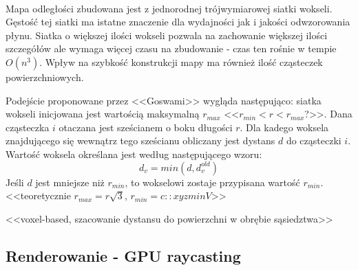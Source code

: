 \paragraph{}
Mapa odległości zbudowana jest z jednorodnej trójwymiarowej siatki wokseli. Gęstość tej siatki ma istatne znaczenie dla wydajności jak i jakości odwzorowania płynu. Siatka o większej ilości wokseli pozwala na zachowanie większej ilości szczegółów ale wymaga więcej czasu na zbudowanie - czas ten rośnie w tempie $O(n^3)$. Wpływ na szybkość konstrukcji mapy ma również ilość cząsteczek powierzchniowych.
\par
Podejście proponowane przez <<Goswami>> wygląda następująco: siatka wokseli inicjowana jest wartością maksymalną $r_{max}$ <<$r_{min}< r < r_{max}$?>>. Dana cząsteczka $i$ otaczana jest sześcianem o boku długości $r$. Dla kadego woksela znajdującego się wewnątrz tego sześcianu obliczany jest dystans $d$ do cząsteczki $i$. Wartość woksela określana jest według następującego wzoru:
\begin{equation}
d_v = min(d, d_v^{old})
\label{eqn:distance_field}
\end{equation}
Jeśli $d$ jest mniejsze niż $r_{min}$, to wokselowi zostaje przypisana wartość $r_{min}$. <<teoretycznie $r_{max} = r\sqrt{3}$, $r_{min} = c::xyzminV$>>
\par
<<voxel-based, szacowanie dystansu do powierzchni w obrębie sąsiedztwa>>
\par


\subsection{Renderowanie - GPU raycasting}


